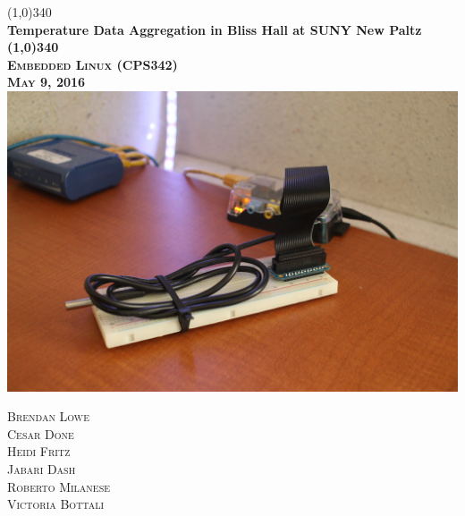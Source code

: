 \documentclass{article}
\begin{document}
	\begin{titlepage}
		\begin{center}
			\line(1,0){340}\\
			[0.25in]
			\huge\bfseries Temperature Data Aggregation in Bliss Hall at SUNY New Paltz\\
			[2mm]
			\line(1,0){340}\\
			[1.1cm]
			\textsc{\Large Embedded Linux (CPS342)\\ May 9, 2016}\\
			[1cm]
			\includegraphics[scale=.15]{rpi.jpg}\\
			[1cm]
		\end{center}
		
		\begin{flushright}
			\textsc{\Large Brendan Lowe\\
				Cesar Done\\
				Heidi Fritz\\
				Jabari Dash\\
				Roberto Milanese\\
				Victoria Bottali\\}
		\end{flushright}
	\end{titlepage}
	
	\tableofcontents
	
	\newpage	
\end{document}
